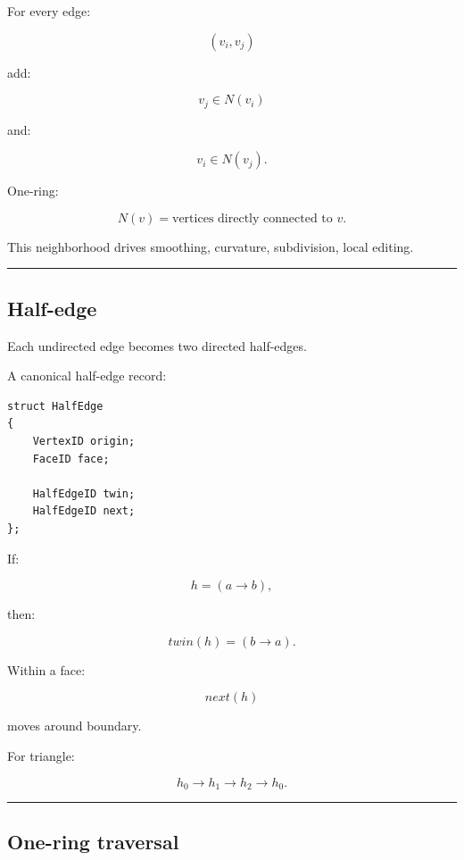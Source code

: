 \hypertarget{04-visual-computing-ii-ch041-vertex-adjacency}{}

For every edge:

\[
(v_i,v_j)
\]

add:

\[
v_j\in N(v_i)
\]

and:

\[
v_i\in N(v_j).
\]

One-ring:

\[
\boxed{
N(v)
=
\text{vertices directly connected to }v.
}
\]

This neighborhood drives smoothing, curvature, subdivision, local editing.

\begin{center}\rule{0.5\linewidth}{0.5pt}\end{center}

\subsection{Half-edge}\label{04-visual-computing-ii-ch041-half-edge}

\hypertarget{04-visual-computing-ii-ch041-half-edge}{}

Each undirected edge becomes two directed half-edges.

A canonical half-edge record:

\begin{verbatim}
struct HalfEdge
{
    VertexID origin;
    FaceID face;

    HalfEdgeID twin;
    HalfEdgeID next;
};
\end{verbatim}

If:

\[
h=(a\rightarrow b),
\]

then:

\[
twin(h)
=
(b\rightarrow a).
\]

Within a face:

\[
next(h)
\]

moves around boundary.

For triangle:

\[
h_0\rightarrow h_1\rightarrow h_2\rightarrow h_0.
\]

\begin{center}\rule{0.5\linewidth}{0.5pt}\end{center}

\subsection{One-ring traversal}\label{04-visual-computing-ii-ch041-one-ring-traversal}

